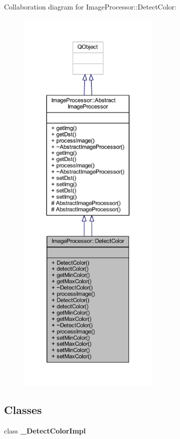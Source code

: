 Collaboration diagram for Image\+Processor\+:\+:Detect\+Color\+:\nopagebreak
\begin{figure}[H]
\begin{center}
\leavevmode
\includegraphics[height=550pt]{d6/dc2/class_image_processor_1_1_detect_color__coll__graph}
\end{center}
\end{figure}
\subsection*{Classes}
\begin{DoxyCompactItemize}
\item 
class {\bfseries \+\_\+\+Detect\+Color\+Impl}
\end{DoxyCompactItemize}
